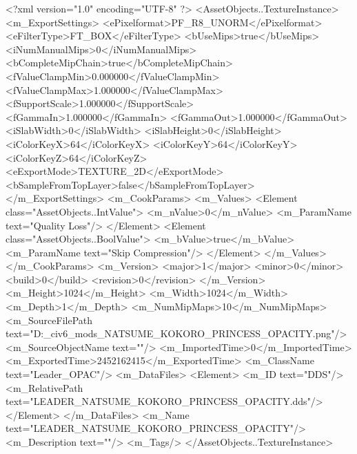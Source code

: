 <?xml version="1.0" encoding="UTF-8" ?>
<AssetObjects..TextureInstance>
	<m_ExportSettings>
		<ePixelformat>PF_R8_UNORM</ePixelformat>
		<eFilterType>FT_BOX</eFilterType>
		<bUseMips>true</bUseMips>
		<iNumManualMips>0</iNumManualMips>
		<bCompleteMipChain>true</bCompleteMipChain>
		<fValueClampMin>0.000000</fValueClampMin>
		<fValueClampMax>1.000000</fValueClampMax>
		<fSupportScale>1.000000</fSupportScale>
		<fGammaIn>1.000000</fGammaIn>
		<fGammaOut>1.000000</fGammaOut>
		<iSlabWidth>0</iSlabWidth>
		<iSlabHeight>0</iSlabHeight>
		<iColorKeyX>64</iColorKeyX>
		<iColorKeyY>64</iColorKeyY>
		<iColorKeyZ>64</iColorKeyZ>
		<eExportMode>TEXTURE_2D</eExportMode>
		<bSampleFromTopLayer>false</bSampleFromTopLayer>
	</m_ExportSettings>
	<m_CookParams>
		<m_Values>
			<Element class="AssetObjects..IntValue">
				<m_nValue>0</m_nValue>
				<m_ParamName text="Quality Loss"/>
			</Element>
			<Element class="AssetObjects..BoolValue">
				<m_bValue>true</m_bValue>
				<m_ParamName text="Skip Compression"/>
			</Element>
		</m_Values>
	</m_CookParams>
	<m_Version>
		<major>1</major>
		<minor>0</minor>
		<build>0</build>
		<revision>0</revision>
	</m_Version>
	<m_Height>1024</m_Height>
	<m_Width>1024</m_Width>
	<m_Depth>1</m_Depth>
	<m_NumMipMaps>10</m_NumMipMaps>
	<m_SourceFilePath text="D:\Documents\GitHub\Uzuki_civ6_mods\LandsolKokkoro\LEADER_NATSUME_KOKORO_PRINCESS_OPACITY.png"/>
	<m_SourceObjectName text=""/>
	<m_ImportedTime>0</m_ImportedTime>
	<m_ExportedTime>2452162415</m_ExportedTime>
	<m_ClassName text="Leader_OPAC"/>
	<m_DataFiles>
		<Element>
			<m_ID text="DDS"/>
			<m_RelativePath text="LEADER_NATSUME_KOKORO_PRINCESS_OPACITY.dds"/>
		</Element>
	</m_DataFiles>
	<m_Name text="LEADER_NATSUME_KOKORO_PRINCESS_OPACITY"/>
	<m_Description text=""/>
	<m_Tags/>
</AssetObjects..TextureInstance>

